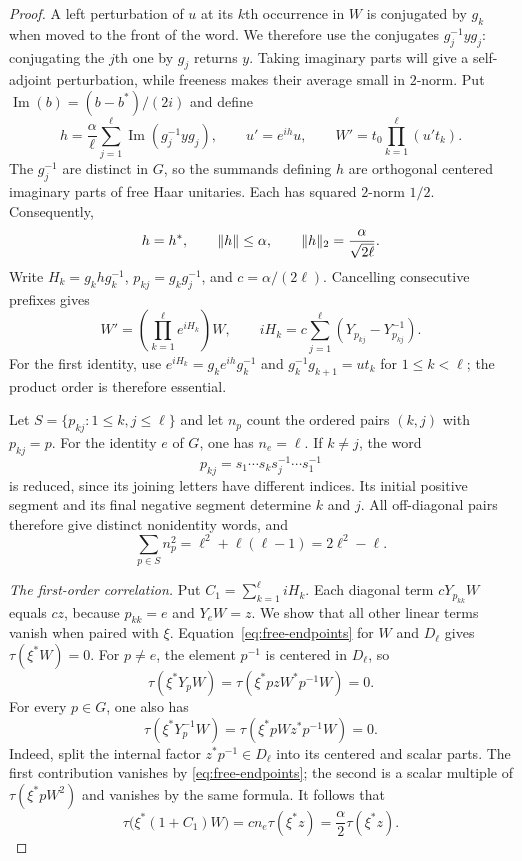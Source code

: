 \begin{proof}
A left perturbation of $u$ at its $k$th occurrence in $W$ is
conjugated by $g_k$ when moved to the front of the word.  We therefore
use the conjugates $g_j^{-1}yg_j$: conjugating the $j$th one by
$g_j$ returns $y$.  Taking imaginary parts will give a self-adjoint
perturbation, while freeness makes their average small in $2$-norm.
Put $\operatorname{Im}(b)=(b-b^*)/(2i)$ and define
\[
  h=\frac\alpha\ell\sum_{j=1}^{\ell}
                \operatorname{Im}(g_j^{-1}yg_j),\qquad
  u'=e^{ih}u,\qquad
  W'=t_0\prod_{k=1}^{\ell}(u't_k).
\]
The $g_j^{-1}$ are distinct in $G$, so the summands defining $h$
are orthogonal centered imaginary parts of free Haar unitaries.
Each has squared $2$-norm $1/2$.  Consequently,
\[
  h=h^*,\qquad \lVert h\rVert\le\alpha,\qquad
  \lVert h\rVert_2=\frac\alpha{\sqrt{2\ell}}.
\]
Write $H_k=g_khg_k^{-1}$, $p_{kj}=g_kg_j^{-1}$,
and $c=\alpha/(2\ell)$.  Cancelling consecutive prefixes gives
\begin{equation}\label{eq:perturbation-prefix}
  W'=\left(\prod_{k=1}^{\ell}e^{iH_k}\right)W,
  \qquad
  iH_k=c\sum_{j=1}^{\ell}
                  (Y_{p_{kj}}-Y_{p_{kj}}^{-1}).
\end{equation}
For the first identity, use
$e^{iH_k}=g_ke^{ih}g_k^{-1}$ and
$g_k^{-1}g_{k+1}=ut_k$ for $1\le k<\ell$; the product order is
therefore essential.

Let $S=\{p_{kj}:1\le k,j\le\ell\}$ and let $n_p$ count the
ordered pairs $(k,j)$ with $p_{kj}=p$.
For the identity $e$ of $G$, one has $n_e=\ell$.
If $k\ne j$, the word
\[
  p_{kj}=s_1\cdots s_k s_j^{-1}\cdots s_1^{-1}
\]
is reduced, since its joining letters have different indices.
Its initial positive segment and its final negative segment
determine $k$ and $j$.  All off-diagonal pairs therefore give
distinct nonidentity words, and
\begin{equation}\label{eq:perturbation-multiplicity}
  \sum_{p\in S}n_p^2=\ell^2+\ell(\ell-1)=2\ell^2-\ell.
\end{equation}

\smallskip\noindent
\emph{The first-order correlation.}
Put $C_1=\sum_{k=1}^{\ell}iH_k$.  Each diagonal term
$cY_{p_{kk}}W$ equals $cz$, because $p_{kk}=e$ and $Y_eW=z$.
We show that all other linear terms vanish when paired with $\xi$.
Equation~\eqref{eq:free-endpoints} for $W$ and $D_\ell$ gives
$\tau(\xi^*W)=0$.  For $p\ne e$, the element $p^{-1}$ is
centered in $D_\ell$, so
\[
  \tau(\xi^*Y_pW)
   =\tau(\xi^*p z W^*p^{-1}W)=0.
\]
For every $p\in G$, one also has
\[
  \tau(\xi^*Y_p^{-1}W)
   =\tau(\xi^*p W z^*p^{-1}W)=0.
\]
Indeed, split the internal factor $z^*p^{-1}\in D_\ell$ into
its centered and scalar parts.  The first contribution vanishes
by \eqref{eq:free-endpoints}; the second is a scalar multiple of
$\tau(\xi^*pW^2)$ and vanishes by the same formula.
It follows that
\[
  \tau\bigl(\xi^*(1+C_1)W\bigr)
   =c n_e\tau(\xi^*z)=\frac\alpha2\tau(\xi^*z).
\]


\end{proof}

